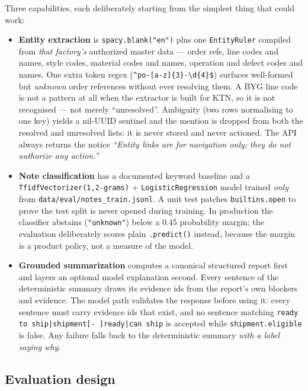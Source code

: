 \documentclass[11pt,a4paper]{article}
\begin{document}
Three capabilities, each deliberately starting from the simplest thing that
could work:

\begin{itemize}
\item \textbf{Entity extraction} is \texttt{spacy.blank("en")} plus one
  \texttt{EntityRuler} compiled from \emph{that factory's} authorized master
  data --- order refs, line codes and names, style codes, material codes and
  names, operation and defect codes and names. One extra token regex
  (\texttt{\^{}po-[a-z]\{3\}-\textbackslash d\{4\}\$}) surfaces well-formed but
  \emph{unknown} order references without ever resolving them. A BYG line code is
  not a pattern at all when the extractor is built for KTN, so it is not
  recognised --- not merely ``unresolved''. Ambiguity (two rows normalising to
  one key) yields a nil-UUID sentinel and the mention is dropped from both the
  resolved and unresolved lists: it is never stored and never actioned. The API
  always returns the notice \emph{``Entity links are for navigation only; they do
  not authorize any action.''}
\item \textbf{Note classification} has a documented keyword baseline and a
  \texttt{TfidfVectorizer(1,2-grams)} + \texttt{LogisticRegression} model
  trained \emph{only} from \texttt{data/eval/notes\_train.jsonl}. A unit test
  patches \texttt{builtins.open} to prove the test split is never opened during
  training. In production the classifier abstains (\texttt{"unknown"}) below a
  0.45 probability margin; the evaluation deliberately scores plain
  \texttt{.predict()} instead, because the margin is a product policy, not a
  measure of the model.
\item \textbf{Grounded summarization} computes a canonical structured report
  first and layers an optional model explanation second. Every sentence of the
  deterministic summary draws its evidence ids from the report's own blockers
  and evidence. The model path validates the response before using it: every
  sentence must carry evidence ids that exist, and no sentence matching
  \texttt{ready to ship|shipment[- ]ready|can ship} is accepted while
  \texttt{shipment.eligible} is false. Any failure falls back to the
  deterministic summary \emph{with a label saying why}.
\end{itemize}

\subsection{Evaluation design}
\end{document}

